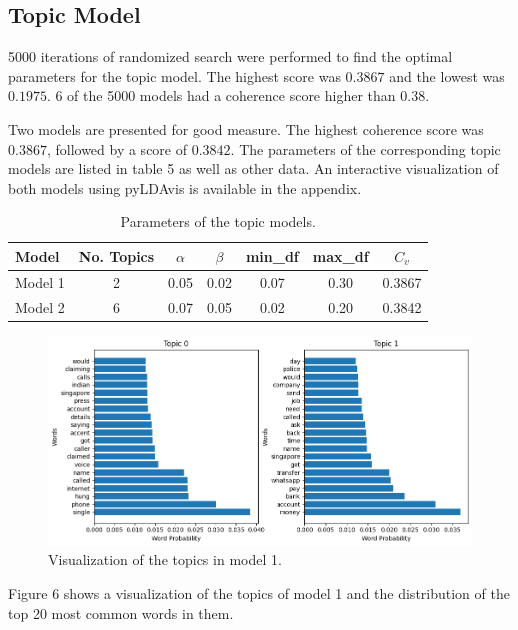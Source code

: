 \subsection{Topic Model}

5000 iterations of randomized search were performed to find the optimal parameters for the topic model. The highest score was $0.3867$ and the lowest was $0.1975$. 6 of the 5000 models had a coherence score higher than $0.38$.

Two models are presented for good measure. The highest coherence score was $0.3867$, followed by a score of $0.3842$. The parameters of the corresponding topic models are listed in table 5 as well as other data. An interactive visualization of both models using pyLDAvis is available in the appendix.

\begin{table}[!h]
    \centering
    \begin{tabular}[\textwidth]{lcccccc}
        \hline
        \textbf{Model}  & No. Topics & $\alpha$ & $\beta$ & min\_df & max\_df & $C_v$ \\ \hline
        Model 1 & 2 & 0.05 & 0.02 & 0.07 & 0.30 & 0.3867 \\
        Model 2 & 6 & 0.07 & 0.05 & 0.02 & 0.20 & 0.3842 \\ \hline
    \end{tabular}
    \caption{Parameters of the topic models.}
\end{table}

\begin{figure}[H]
    \centering
    \includegraphics[width=\textwidth]{resources/model_n_2.png}
    \caption{Visualization of the topics in model 1.}
    \label{fig:topic_model_1}
\end{figure}

Figure 6 shows a visualization of the topics of model 1 and the distribution of the top 20 most common words in them.

